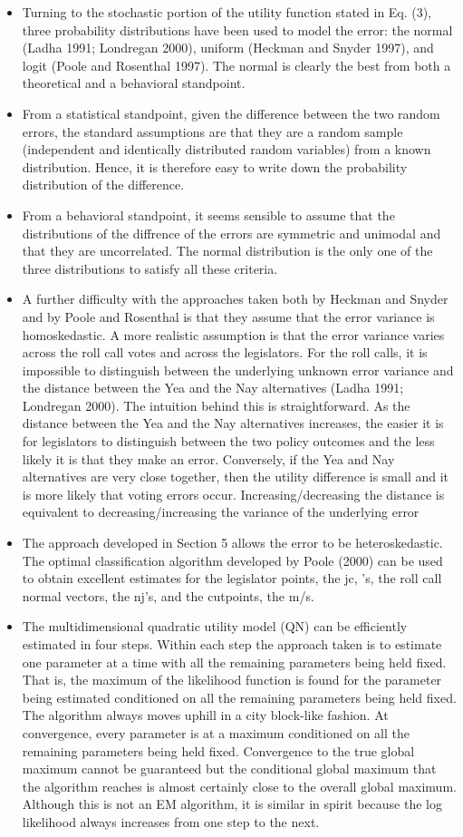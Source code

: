 \documentclass[a4paper,12pt]{article}
\begin{document}
\begin{enumerate}
\begin{itemize}
\item Turning to the stochastic portion of the utility function stated in Eq. (3), three probability distributions have been used to model the error: the normal (Ladha 1991; Londregan 2000), uniform (Heckman and Snyder 1997), and logit (Poole and Rosenthal 1997). The normal is clearly the best from both a theoretical and a behavioral standpoint. 
\item From a statistical standpoint, given the difference between the two random errors, the standard assumptions are that they are a random sample (independent and identically distributed random variables) from a known distribution. Hence, it is therefore easy to write down the probability distribution of the difference.
\item  From a behavioral standpoint, it seems sensible to assume that the distributions of the diffrence of the errors are symmetric and unimodal and that they are uncorrelated. The normal distribution is the only one of the three distributions to satisfy all these criteria.
\item A further difficulty with the approaches taken both by Heckman and Snyder and by Poole and Rosenthal is that they assume that the error variance is homoskedastic. A more realistic assumption is that the error variance varies across the roll call votes and across the legislators. For the roll calls, it is impossible to distinguish between the underlying unknown error variance and the distance between the Yea and the Nay alternatives (Ladha 1991; Londregan 2000). The intuition behind this is straightforward. As the distance between the Yea and the Nay alternatives increases, the easier it is for legislators to distinguish between the two policy outcomes and the less likely it is that they make an error. Conversely, if the Yea and Nay alternatives are very close together, then the utility difference is small and it is more likely that voting errors occur. Increasing/decreasing the distance is equivalent to decreasing/increasing the variance of the underlying error
\item The approach developed in Section 5 allows the error to be heteroskedastic. The optimal classification algorithm developed by Poole (2000) can be used to obtain excellent estimates for the legislator points, the jc, 's, the roll call normal vectors, the nj's, and the cutpoints, the m/s.
\item The multidimensional quadratic utility model (QN) can be efficiently estimated in four steps. Within each step the approach taken is to estimate one parameter at a time with all the remaining parameters being held fixed. That is, the maximum of the likelihood function is found for the parameter being estimated conditioned on all the remaining parameters being held fixed. The algorithm always moves uphill in a city block-like fashion. At convergence, every parameter is at a maximum conditioned on all the remaining parameters being held fixed. Convergence to the true global maximum cannot be guaranteed but the conditional global maximum that the algorithm reaches is almost certainly close to the overall global maximum. Although this is not an EM algorithm, it is similar in spirit because the log likelihood always increases from one step to the next.

\end{itemize}
\end{enumerate}
\end{document}
